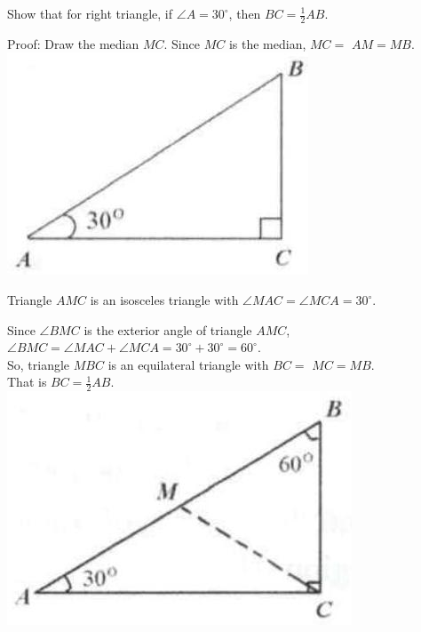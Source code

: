 \documentclass{article}
\begin{document}
Show that for right triangle, if \(\angle A=30^{\circ}\), then \(B C=\frac{1}{2} A B\).

Proof:
Draw the median \(M C\). Since \(M C\) is the median, \(M C=\) \(A M=M B\).\\
\centering
\includegraphics[width=\textwidth]{images/009(4).jpg}

Triangle \(A M C\) is an isosceles triangle with \(\angle M A C=\angle M C A=30^{\circ}\).

Since \(\angle B M C\) is the exterior angle of triangle \(A M C\), \(\angle B M C=\angle M A C+\angle M C A=30^{\circ}+30^{\circ}=60^{\circ}\).\\
So, triangle \(M B C\) is an equilateral triangle with \(B C=\) \(M C=M B\).\\
That is \(B C=\frac{1}{2} A B\).\\
\centering
\includegraphics[width=\textwidth]{images/009(3).jpg}
\end{document}
